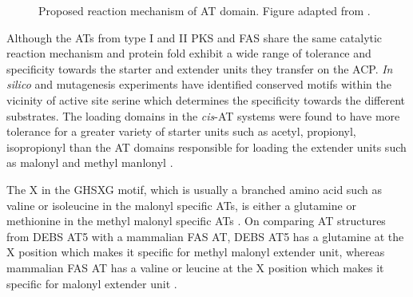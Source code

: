 			\setlength\fboxsep{5pt}
			\setlength\fboxrule{1.5pt}
			\begin{figure} []
			\centering
			\caption[Proposed reaction mechanism of AT domain]{Proposed reaction mechanism of AT domain. Figure adapted from \parencite{Smith2007}.}
			\label{fig:ATreact}
			\end{figure}
			
			Although the ATs from type I and II PKS and FAS share the same catalytic reaction mechanism and protein fold exhibit a wide range of tolerance and specificity towards the starter and extender units they transfer on the ACP. \textit{In silico} and mutagenesis experiments have identified conserved motifs within the vicinity of active site serine which determines the specificity towards the different substrates. The loading domains in the \textit{cis}-AT systems were found to have more tolerance for a greater variety of starter units such as acetyl, propionyl, isopropionyl than the AT domains responsible for loading the extender units such as malonyl and methyl manlonyl \parencite{Lau1999a,Liou2003}. 
			
			The X in the GHSXG motif, which is usually a branched amino acid such as valine or isoleucine in the malonyl specific ATs, is either a glutamine or methionine in the methyl malonyl specific ATs \parencite{Haydock1995}. On comparing AT structures from DEBS AT5 with a mammalian FAS AT, DEBS AT5 has a glutamine at the X position which makes it specific for methyl malonyl extender unit, whereas mammalian FAS AT has a valine or leucine at the X position which makes it specific for malonyl extender unit \parencite{Tang2006}. 
			
